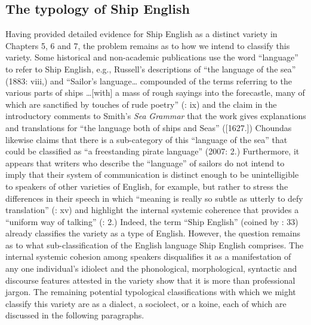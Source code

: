 \subsection{\textbf{The} \textbf{typology} \textbf{of} \textbf{Ship} \textbf{English} }%

Having provided detailed evidence for Ship English as a distinct variety in Chapters 5, 6 and 7, the problem remains as to how we intend to classify this variety. Some historical and non-academic publications use the word “language” to refer to Ship English, e.g., Russell’s descriptions of “the language of the sea” (1883: viii,) and “Sailor’s language… compounded of the terms referring to the various parts of ships …[with] a mass of rough sayings into the forecastle, many of which are sanctified by touches of rude poetry” (\citealt{Russell1883}: ix) and the claim in the introductory comments to Smith’s \textit{Sea} \textit{Grammar} that the work gives explanations and translations for “the language both of ships and Seas” (\citealt{Smith1968}[1627.]) Choundas likewise claims that there is a sub-category of this “language of the sea” that could be classified as “a freestanding pirate language” (2007: 2.) Furthermore, it appears that writers who describe the “language” of sailors do not intend to imply that their system of communication is distinct enough to be unintelligible to speakers of other varieties of English, for example, but rather to stress the differences in their speech in which “meaning is really so subtle as utterly to defy translation” (\citealt{Russell1883}: xv) and highlight the internal systemic coherence that provides a “uniform way of talking” (\citealt{Choundas2007}: 2.) Indeed, the term “Ship English” (coined by \citealt{Hancock1976}: 33) already classifies the variety as a type of English. However, the question remains as to what sub-classification of the English language Ship English comprises. The internal systemic cohesion among speakers disqualifies it as a manifestation of any one individual’s idiolect and the phonological, morphological, syntactic and discourse features attested in the variety show that it is more than professional jargon. The remaining potential typological classifications with which we might classify this variety are as a dialect, a sociolect, or a koine, each of which are discussed in the following paragraphs. 

